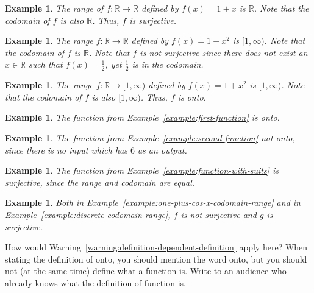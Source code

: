 \documentclass{book}
\newcounter{ekcounter}%
\theoremstyle{ekimcustom}
\newtheorem{example}[ekcounter]{Example}
\begin{document}
\begin{example}
The range of $f : \mathbb{R} \to \mathbb{R}$ defined by $f(x) = 1 + x$ is $\mathbb{R}$. Note that the codomain of $f$ is also $\mathbb{R}$. Thus, $f$ is surjective.
\end{example}
\begin{example}
The range $f : \mathbb{R} \to \mathbb{R}$ defined by $f(x) = 1 + x^2$ is $[1,\infty)$. Note that the codomain of $f$ is $\mathbb{R}$. Note that $f$ is not surjective since there does not exist an $x \in \mathbb{R}$ such that $f(x)=\frac12$, yet $\frac12$ is in the codomain.
\end{example}
\begin{example}
The range $f : \mathbb{R} \to [1,\infty)$ defined by $f(x) = 1 + x^2$ is $[1,\infty)$. Note that the codomain of $f$ is also $[1,\infty)$. Thus, $f$ is onto.
\end{example}

\begin{example}
The function from Example~\ref{example:first-function} is onto.
\end{example}
\begin{example}
The function from Example~\ref{example:second-function} not onto, since there is no input which has $6$ as an output.
\end{example}
\begin{example}
The function from Example~\ref{example:function-with-suits} is surjective, since the range and codomain are equal.
\end{example}
\begin{example}
Both in Example~\ref{example:one-plus-cos-x-codomain-range} and in Example~\ref{example:discrete-codomain-range}, $f$ is not surjective and $g$ is surjective.
\end{example}

How would Warning~\ref{warning:definition-dependent-definition} apply here? When stating the definition of onto, you should mention the word onto, but you should not (at the same time) define what a function is. Write to an audience who already knows what the definition of function is.

\end{document}
